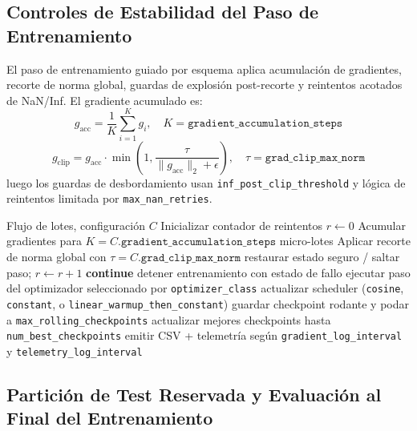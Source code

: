 \subsection{Controles de Estabilidad del Paso de Entrenamiento}

El paso de entrenamiento guiado por esquema aplica acumulación de gradientes, recorte de norma global, guardas de explosión post-recorte y reintentos acotados de NaN/Inf. El gradiente acumulado es:
\[
g_{\text{acc}}=\frac{1}{K}\sum_{i=1}^{K} g_i,\quad K=\texttt{gradient\_accumulation\_steps}
\]
\[
g_{\text{clip}} = g_{\text{acc}}\cdot
\min\left(1,\frac{\tau}{\|g_{\text{acc}}\|_2+\epsilon}\right),\quad
\tau=\texttt{grad\_clip\_max\_norm}
\]
luego los guardas de desbordamiento usan \texttt{inf\_post\_clip\_threshold} y lógica de reintentos limitada por \texttt{max\_nan\_retries}.

\begin{algorithm}[t]
\caption{Paso de Entrenamiento Guiado por Esquema con Controles de Estabilidad}
\begin{algorithmic}[1]
\Require Flujo de lotes, configuración $C$
\State Inicializar contador de reintentos $r\gets 0$
    \State Acumular gradientes para $K=C.\texttt{gradient\_accumulation\_steps}$ micro-lotes
    \State Aplicar recorte de norma global con $\tau=C.\texttt{grad\_clip\_max\_norm}$
            \State restaurar estado seguro / saltar paso; $r \gets r+1$
            \State \textbf{continue}
        \Else
            \State detener entrenamiento con estado de fallo
        \EndIf
    \EndIf
    \State ejecutar paso del optimizador seleccionado por \texttt{optimizer\_class}
    \State actualizar scheduler (\texttt{cosine}, \texttt{constant}, o \texttt{linear\_warmup\_then\_constant})
        \State guardar checkpoint rodante y podar a \texttt{max\_rolling\_checkpoints}
    \EndIf
    \State actualizar mejores checkpoints hasta \texttt{num\_best\_checkpoints}
    \State emitir CSV + telemetría según \texttt{gradient\_log\_interval} y \texttt{telemetry\_log\_interval}
\EndFor
\end{algorithmic}
\end{algorithm}

\subsection{Partición de Test Reservada y Evaluación al Final del Entrenamiento}

